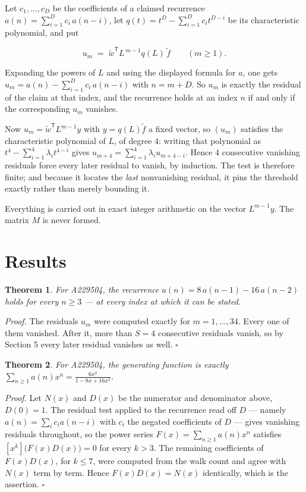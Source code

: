 \documentclass[11pt]{article}
\newtheorem{theorem}{Theorem}
\theoremstyle{definition}
\begin{document}
Let $c_1,\dots,c_D$ be the coefficients of a claimed recurrence $a(n) = \sum_{i=1}^{D} c_i\,a(n-i)$, let $q(t) = t^{D} - \sum_{i=1}^{D} c_i t^{D-i}$ be its characteristic polynomial, and put

\[u_m \;=\; \tilde w^{\mathsf T} L^{\,m-1} q(L)\,\tilde f \qquad (m \ge 1).\]

Expanding the powers of $L$ and using the displayed formula for $a$, one gets $u_m = a(n) - \sum_{i=1}^{D} c_i\,a(n-i)$ with $n = m + D$. So $u_m$ is exactly the residual of the claim at that index, and the recurrence holds at an index $n$ if and only if the corresponding $u_m$ vanishes.

Now $u_m = \tilde w^{\mathsf T} L^{m-1} y$ with $y = q(L)\tilde f$ a fixed vector, so $(u_m)$ satisfies the characteristic polynomial of $L$, of degree $4$: writing that polynomial as $t^{4} - \sum_{i=1}^{4} \lambda_i t^{4-i}$ gives $u_{m+4} = \sum_{i=1}^{4} \lambda_i u_{m+4-i}$. Hence $4$ consecutive vanishing residuals force every later residual to vanish, by induction. The test is therefore finite; and because it locates the {\itshape last} nonvanishing residual, it pins the threshold exactly rather than merely bounding it.

Everything is carried out in exact integer arithmetic on the vector $L^{m-1}y$. The matrix $M$ is never formed.

\section{Results}

\begin{theorem} For A229504, the recurrence $a(n) = 8\,a(n-1) - 16\,a(n-2)$ holds for every $n \ge 3$ --- at every index at which it can be stated.\end{theorem}

{\itshape Proof.} The residuals $u_m$ were computed exactly for $m = 1,\dots,34$. Every one of them vanished. After it, more than $S = 4$ consecutive residuals vanish, so by Section 5 every later residual vanishes as well. $\square$

\begin{theorem} For A229504, the generating function is exactly $\sum_{n\ge 1} a(n)x^n = \frac{6x^{2}}{1 - 8x + 16x^{2}}$.\end{theorem}

{\itshape Proof.} Let $N(x)$ and $D(x)$ be the numerator and denominator above, $D(0)=1$. The residual test applied to the recurrence read off $D$ --- namely $a(n) = \sum_i c_i a(n-i)$ with $c_i$ the negated coefficients of $D$ --- gives vanishing residuals throughout, so the power series $F(x)=\sum_{n\ge 1}a(n)x^n$ satisfies $[x^k]\bigl(F(x)D(x)\bigr) = 0$ for every $k > 3$. The remaining coefficients of $F(x)D(x)$, for $k \le 7$, were computed from the walk count and agree with $N(x)$ term by term. Hence $F(x)D(x) = N(x)$ identically, which is the assertion. $\square$
\end{document}
